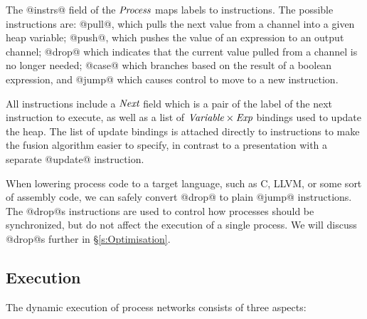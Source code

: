 The @instrs@ field of the $\textit{Process}$ maps labels to instructions. The possible instructions are: @pull@, which pulls the next value from a channel into a given heap variable; @push@, which pushes the value of an expression to an output channel;  @drop@ which indicates that the current value pulled from a channel is no longer needed; @case@ which branches based on the result of a boolean expression, and @jump@ which causes control to move to a new instruction.

All instructions include a $\textit{Next}$ field which is a pair of the label of the next instruction to execute, as well as a list of $\textit{Variable} \times \textit{Exp}$ bindings used to update the heap. The list of update bindings is attached directly to instructions to make the fusion algorithm easier to specify, in contrast to a presentation with a separate @update@ instruction. 

When lowering process code to a target language, such as C, LLVM, or some sort of assembly code, we can safely convert @drop@ to plain @jump@ instructions. The @drop@s instructions are used to control how processes should be synchronized, but do not affect the execution of a single process. We will discuss @drop@s further in \S\ref{s:Optimisation}.




\subsection{Execution}
\label{s:Process:Eval}

The dynamic execution of process networks consists of three aspects:

